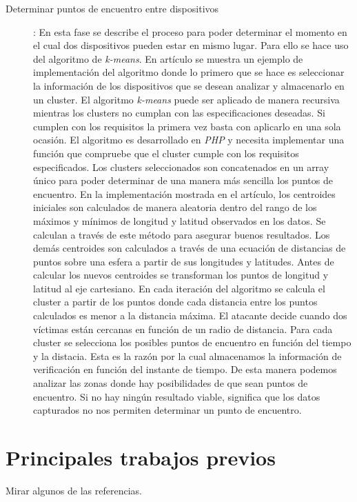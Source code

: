 \documentclass[a4paper,11pt]{report}
\begin{document}
\begin{description}
\item [Determinar puntos de encuentro entre dispositivos]: En esta fase se describe el proceso para poder determinar el momento en el cual dos dispositivos pueden estar en mismo lugar. Para ello se hace uso del algoritmo de \emph{k-means}. En artículo se muestra un ejemplo de implementación del algoritmo donde lo primero que se hace es seleccionar la información de los dispositivos que se desean analizar y almacenarlo en un cluster. El algoritmo \emph{k-means} puede ser aplicado de manera recursiva mientras los clusters no cumplan con las especificaciones deseadas. Si cumplen con los requisitos la primera vez basta con aplicarlo en una sola ocasión. El algoritmo es desarrollado en \emph{PHP} y necesita implementar una función que compruebe que el cluster cumple con los requisitos especificados. Los clusters seleccionados son concatenados en un array único para poder determinar de una manera más sencilla los puntos de encuentro. En la implementación mostrada en el artículo, los centroides iniciales son calculados de manera aleatoria dentro del rango de los máximos y mínimos de longitud y latitud observados en los datos. Se calculan a través de este método para asegurar buenos resultados. Los demás centroides son calculados a través de una ecuación de distancias de puntos sobre una esfera a partir de sus longitudes y latitudes. Antes de calcular los nuevos centroides se transforman los puntos de longitud y latitud al eje cartesiano. En cada iteración del algoritmo se calcula el cluster a partir de los puntos donde cada distancia entre los puntos calculados es menor a la distancia máxima. El atacante decide cuando dos víctimas están cercanas en función de un radio de distancia. Para cada cluster se selecciona los posibles puntos de encuentro en función del tiempo y la distacia. Esta es la razón por la cual almacenamos la información de verificación en función del instante de tiempo. De esta manera podemos analizar las zonas donde hay posibilidades de que sean puntos de encuentro. Si no hay ningún resultado viable, significa que los datos capturados no nos permiten determinar un punto de encuentro.

\end{description}



\chapter{Principales trabajos previos}
Mirar algunos de las referencias.
\end{document}
